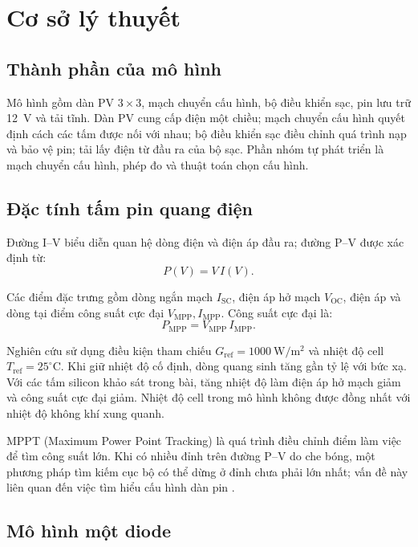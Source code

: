 \section{Cơ sở lý thuyết}
\label{sec:theory}

\subsection{Thành phần của mô hình}

Mô hình gồm dàn PV \(3\times3\), mạch chuyển cấu hình, bộ điều khiển sạc, pin lưu trữ 12~V và tải tĩnh. Dàn PV cung cấp điện một chiều; mạch chuyển cấu hình quyết định cách các tấm được nối với nhau; bộ điều khiển sạc điều chỉnh quá trình nạp và bảo vệ pin; tải lấy điện từ đầu ra của bộ sạc. Phần nhóm tự phát triển là mạch chuyển cấu hình, phép đo và thuật toán chọn cấu hình.

\subsection{Đặc tính tấm pin quang điện}
\label{sec:pv-characteristics}

Đường I--V biểu diễn quan hệ dòng điện và điện áp đầu ra; đường P--V được xác định từ:
\[
P(V)=V\,I(V).
\]

Các điểm đặc trưng gồm dòng ngắn mạch \(I_{\mathrm{SC}}\), điện áp hở mạch \(V_{\mathrm{OC}}\), điện áp và dòng tại điểm công suất cực đại \(V_{\mathrm{MPP}}, I_{\mathrm{MPP}}\). Công suất cực đại là:
\[
P_{\mathrm{MPP}}=V_{\mathrm{MPP}}\,I_{\mathrm{MPP}}.
\]

Nghiên cứu \cite{yaqoob} sử dụng điều kiện tham chiếu \(G_{\mathrm{ref}}=1000\ \mathrm{W/m^2}\) và nhiệt độ cell \(T_{\mathrm{ref}}=25^\circ\mathrm{C}\). Khi giữ nhiệt độ cố định, dòng quang sinh tăng gần tỷ lệ với bức xạ. Với các tấm silicon khảo sát trong bài, tăng nhiệt độ làm điện áp hở mạch giảm và công suất cực đại giảm. Nhiệt độ cell trong mô hình không được đồng nhất với nhiệt độ không khí xung quanh.

MPPT (Maximum Power Point Tracking) là quá trình điều chỉnh điểm làm việc để tìm công suất lớn. Khi có nhiều đỉnh trên đường P--V do che bóng, một phương pháp tìm kiếm cục bộ có thể dừng ở đỉnh chưa phải lớn nhất; vấn đề này liên quan đến việc tìm hiểu cấu hình dàn pin \cite{thanh}.

\subsection{Mô hình một diode}
\label{sec:pv-model}

